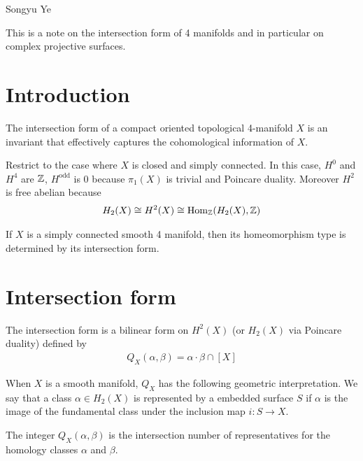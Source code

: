 \documentclass[12pt]{article}
\begin{document}
Songyu Ye

This is a note on the intersection form of 4 manifolds and
in particular on complex projective surfaces.

\section{Introduction}
The intersection form of a compact oriented topological
4-manifold $X$ is an invariant that effectively captures the
cohomological information of $X$.

\hfill

Restrict to the case where $X$ is closed and simply connected. In this case,
$H^0$ and $H^4$ are $\mathbb{Z}$, $H^{\text{odd}}$ is $0$ because $\pi_1(X)$ is trivial and
Poincare duality. Moreover $H^2$ is free abelian because
\begin{align*}
	H_2(X) \cong H^2(X) \cong \operatorname{Hom}_{\mathbb{Z}}(H_2(X), \mathbb{Z})
\end{align*}

\begin{theorem}
	[Freedman] If $X$ is a simply connected smooth 4 manifold, then
	its homeomorphism type is determined by its intersection form.
\end{theorem}

\section{Intersection form}
The intersection form is a bilinear form on $H^2(X)$ (or $H_2(X)$ via
Poincare duality) defined by \begin{align*}
	Q_X(\alpha, \beta) = \alpha \cdot \beta \cap [X]
\end{align*}

When $X$ is a smooth manifold, $Q_X$ has the following geometric interpretation.
We say that a class $\alpha \in H_2(X)$ is represented by a
embedded surface $S$ if $\alpha$ is the image of the fundamental class
under the inclusion map $i: S \to X$.

\hfill

The integer $Q_X(\alpha, \beta)$ is the intersection number of representatives
for the homology classes $\alpha$ and $\beta$.
\end{document}
